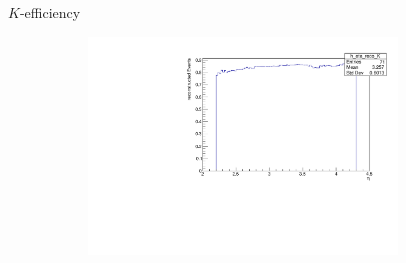 \documentclass[11pt]{beamer}
\begin{document}
\begin{frame}{$K$-efficiency}
\begin{figure}
\begin{subfigure}{0.45\textwidth}
\end{subfigure}
\begin{subfigure}{0.45\textwidth}
\includegraphics[width=0.9\textwidth]{up_pdf/h_eta_reco_K.pdf}
\end{subfigure}
\end{figure}
\end{frame}
\end{document}
